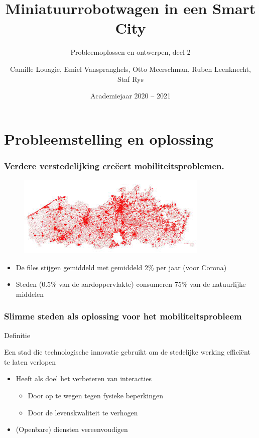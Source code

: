 \documentclass[aspectratio=169,kulak,t,handout]{kulakbeamer} %
\title[Groep 1 - Safety First]{Miniatuurrobotwagen in een Smart City}
\subtitle{Probleemoplossen en ontwerpen, deel 2}
\author{Camille Louagie, Emiel Vanspranghels, Otto Meerschman, Ruben Leenknecht, Staf Rys}
\institute[Kulak]{KU Leuven Kulak}
\date{Academiejaar 2020 -- 2021}
\begin{document}
\begin{titleframe}
\titlepage
\end{titleframe}


\section*{Probleemstelling en oplossing}

\begin{frame}
	\frametitle{\Large Verdere verstedelijking creëert mobiliteitsproblemen.}


	\begin{figure}
		\centering
		\includegraphics[width=.6\textwidth]{ruimtelijkestaat}
		
		\label{fig:ruimtelijkestaat}
	\end{figure}
	\begin{itemize}
	\item  De files stijgen gemiddeld met gemiddeld 2\% per jaar (voor Corona)
	\item  Steden (0.5\% van de aardoppervlakte) consumeren 75\% van de natuurlijke middelen
\end{itemize}

\end{frame}

\begin{frame}
	\frametitle{{\Large Slimme steden als oplossing voor het mobiliteitsprobleem}}
	
\begin{block}{Definitie}
	
	Een stad die technologische innovatie gebruikt om de stedelijke werking efficiënt te laten verlopen
	
\end{block}	
	\begin{itemize}
		\large\item  Heeft als doel het verbeteren van interacties
		\begin{itemize}
			\normalsize\item Door op te wegen tegen fysieke beperkingen
			\item Door de levenskwaliteit te verhogen
		\end{itemize}
		\item  (Openbare) diensten vereenvoudigen
	\end{itemize}
\end{frame}
\end{document}
